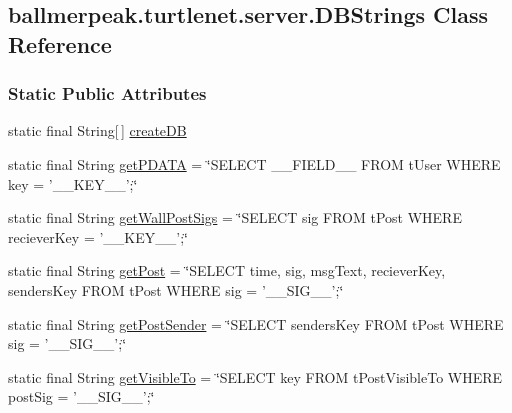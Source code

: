 \hypertarget{classballmerpeak_1_1turtlenet_1_1server_1_1DBStrings}{\subsection{ballmerpeak.\-turtlenet.\-server.\-D\-B\-Strings Class Reference}
\label{classballmerpeak_1_1turtlenet_1_1server_1_1DBStrings}
}
\subsubsection*{Static Public Attributes}
\begin{DoxyCompactItemize}
\item 
static final String\mbox{[}$\,$\mbox{]} \hyperlink{classballmerpeak_1_1turtlenet_1_1server_1_1DBStrings_a70ba551ea4397e98cc09b96eb0d9ff43}{create\-D\-B}
\item 
static final String \hyperlink{classballmerpeak_1_1turtlenet_1_1server_1_1DBStrings_a93ae46feb4aaeb78cac2ba7b4fce04ec}{get\-P\-D\-A\-T\-A} = \char`\"{}S\-E\-L\-E\-C\-T \-\_\-\-\_\-\-F\-I\-E\-L\-D\-\_\-\-\_\- F\-R\-O\-M t\-User W\-H\-E\-R\-E key = '\-\_\-\-\_\-\-K\-E\-Y\-\_\-\-\_\-';\char`\"{}
\item 
static final String \hyperlink{classballmerpeak_1_1turtlenet_1_1server_1_1DBStrings_abc7b51ce40123124593dc92582e256b0}{get\-Wall\-Post\-Sigs} = \char`\"{}S\-E\-L\-E\-C\-T sig F\-R\-O\-M t\-Post W\-H\-E\-R\-E reciever\-Key = '\-\_\-\-\_\-\-K\-E\-Y\-\_\-\-\_\-';\char`\"{}
\item 
static final String \hyperlink{classballmerpeak_1_1turtlenet_1_1server_1_1DBStrings_a80f3d94ed94b75193a7fd3490548739b}{get\-Post} = \char`\"{}S\-E\-L\-E\-C\-T time, sig, msg\-Text, reciever\-Key, senders\-Key F\-R\-O\-M t\-Post W\-H\-E\-R\-E sig = '\-\_\-\-\_\-\-S\-I\-G\-\_\-\-\_\-';\char`\"{}
\item 
static final String \hyperlink{classballmerpeak_1_1turtlenet_1_1server_1_1DBStrings_ad87c5a646e57a7280c16bc34c599eba2}{get\-Post\-Sender} = \char`\"{}S\-E\-L\-E\-C\-T senders\-Key F\-R\-O\-M t\-Post W\-H\-E\-R\-E sig = '\-\_\-\-\_\-\-S\-I\-G\-\_\-\-\_\-';\char`\"{}
\item 
static final String \hyperlink{classballmerpeak_1_1turtlenet_1_1server_1_1DBStrings_a977f96408405a039b29ea0375f014129}{get\-Visible\-To} = \char`\"{}S\-E\-L\-E\-C\-T key F\-R\-O\-M t\-Post\-Visible\-To W\-H\-E\-R\-E post\-Sig = '\-\_\-\-\_\-\-S\-I\-G\-\_\-\-\_\-';\char`\"{}
\item 

\end{DoxyCompactItemize}
